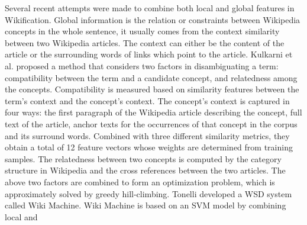 


Several recent attempts were made to combine both local and global features
in Wikification.
Global information is the relation or constraints between Wikipedia
concepts in the whole sentence, it usually comes from the
context similarity between two Wikipedia articles.
The context can either be the content of the article or the
surrounding words of links which point to the article.
Kulkarni et al. \cite{kulkarni2009collective} proposed a method
that considers two factors in disambiguating a term:
compatibility between the term and a candidate concept,
and relatedness among the concepts.
Compatibility is measured based on similarity features between
the term's context and the concept's context. The concept's context
is captured in four ways: the first paragraph of the Wikipedia article
describing the concept, full text of the article, anchor texts for the
occurrences of that concept in the corpus and its surround words.
Combined with three different similarity metrics, they obtain
a total of 12 feature vectors whose weights are determined from
training samples.
The relatedness between two concepts is computed by the category structure
in Wikipedia and the cross references between the two articles.
The above two factors are combined to form an optimization problem,
which is approximately solved by greedy hill-climbing.
Tonelli \cite{Tonelli2012} developed a WSD system called Wiki Machine.
Wiki Machine is based on an SVM model by combining local and
